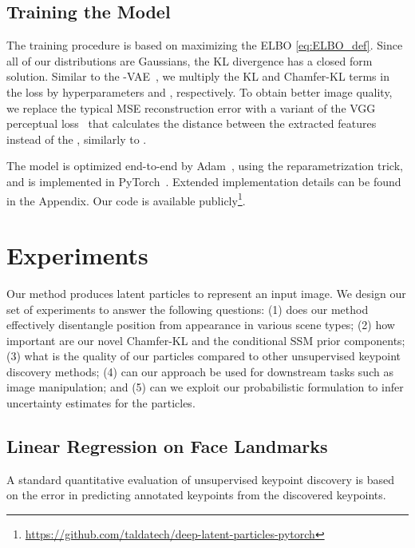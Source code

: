 \documentclass[nohyperref]{article}
\theoremstyle{plain}
\theoremstyle{definition}
\theoremstyle{remark}
\begin{document}
\subsection{Training the Model}
\label{subsec:kp_vae_train}
The training procedure is based on maximizing the ELBO \eqref{eq:ELBO_def}.
Since all of our distributions are Gaussians, the KL divergence has a closed form solution. Similar to the -VAE~\citep{higgins2017beta}, we multiply the KL and Chamfer-KL terms in the loss by hyperparameters  and , respectively.
To obtain better image quality, we replace the typical MSE reconstruction error with a variant of the VGG perceptual loss~\citep{hoshen2019non} that calculates the  distance between the extracted features instead of the , similarly to \citet{jakab2018unsupervised}.



The model is optimized end-to-end by Adam~\cite{adam_14}, using the reparametrization trick, and is implemented in PyTorch~\citep{paszke2017automatic}. Extended implementation details can be found in the Appendix. Our code is available publicly\footnote{\url{https://github.com/taldatech/deep-latent-particles-pytorch}}.




\section{Experiments}
\label{sec:exp}
Our method produces latent particles to represent an input image. We design our set of experiments to answer the following questions: (1) does our method effectively disentangle position from appearance in various scene types; (2) how important are our novel Chamfer-KL and the conditional SSM prior components;
(3) what is the quality of our particles compared to other unsupervised keypoint discovery methods; 
(4) can our approach be used for downstream tasks such as image manipulation; and (5) can we exploit our probabilistic formulation to infer uncertainty estimates for the particles.


\subsection{Linear Regression on Face Landmarks}
\label{subsec:supervised_kp}
A standard quantitative evaluation of unsupervised keypoint discovery is based on the error in predicting annotated keypoints from the discovered keypoints. 
\end{document}
